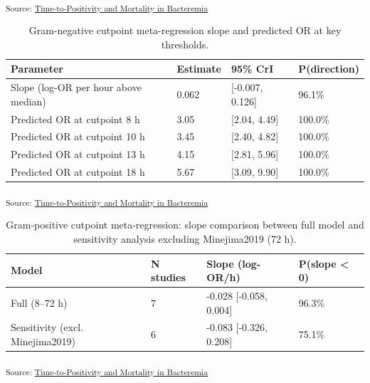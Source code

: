 \documentclass[
  11pt,
]{article}
\begin{document}
\textsubscript{Source:
\href{https://lewis-id-lab.github.io/ttp-bacteremia-meta-analysis/notebooks/mortality-analysis-preview.html\#cell-fig-cutpoint}{Time-to-Positivity
and Mortality in Bacteremia}}

\begin{longtable}[]{@{}llll@{}}

\caption{\label{tbl-gneg-cutpoint}Gram-negative cutpoint meta-regression
slope and predicted OR at key thresholds.}

\tabularnewline

\toprule\noalign{}
Parameter & Estimate & 95\% CrI & P(direction) \\
\midrule\noalign{}
\endhead
\bottomrule\noalign{}
\endlastfoot
Slope (log-OR per hour above median) & 0.062 & {[}-0.007, 0.126{]} &
96.1\% \\
Predicted OR at cutpoint 8 h & 3.05 & {[}2.04, 4.49{]} & 100.0\% \\
Predicted OR at cutpoint 10 h & 3.45 & {[}2.40, 4.82{]} & 100.0\% \\
Predicted OR at cutpoint 13 h & 4.15 & {[}2.81, 5.96{]} & 100.0\% \\
Predicted OR at cutpoint 18 h & 5.67 & {[}3.09, 9.90{]} & 100.0\% \\

\end{longtable}

\textsubscript{Source:
\href{https://lewis-id-lab.github.io/ttp-bacteremia-meta-analysis/notebooks/mortality-analysis-preview.html\#cell-tbl-gneg-cutpoint}{Time-to-Positivity
and Mortality in Bacteremia}}

\begin{longtable}[]{@{}llll@{}}

\caption{\label{tbl-gpos-cutpoint}Gram-positive cutpoint
meta-regression: slope comparison between full model and sensitivity
analysis excluding Minejima2019 (72 h).}

\tabularnewline

\toprule\noalign{}
Model & N studies & Slope (log-OR/h) & P(slope \textless{} 0) \\
\midrule\noalign{}
\endhead
\bottomrule\noalign{}
\endlastfoot
Full (8--72 h) & 7 & -0.028 {[}-0.058, 0.004{]} & 96.3\% \\
Sensitivity (excl. Minejima2019) & 6 & -0.083 {[}-0.326, 0.208{]} &
75.1\% \\

\end{longtable}

\textsubscript{Source:
\href{https://lewis-id-lab.github.io/ttp-bacteremia-meta-analysis/notebooks/mortality-analysis-preview.html\#cell-tbl-gpos-cutpoint}{Time-to-Positivity
and Mortality in Bacteremia}}
\end{document}
